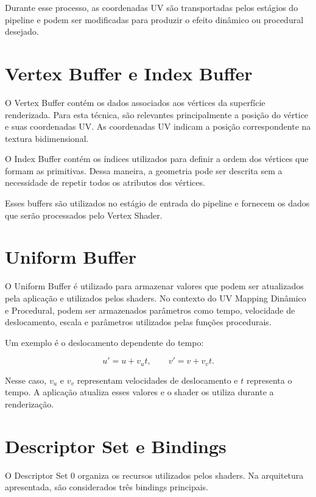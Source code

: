 Durante esse processo, as coordenadas UV são transportadas pelos estágios do
pipeline e podem ser modificadas para produzir o efeito dinâmico ou
procedural desejado.

\section{Vertex Buffer e Index Buffer}

O Vertex Buffer contém os dados associados aos vértices da superfície
renderizada. Para esta técnica, são relevantes principalmente a posição do
vértice e suas coordenadas UV. As coordenadas UV indicam a posição
correspondente na textura bidimensional.

O Index Buffer contém os índices utilizados para definir a ordem dos
vértices que formam as primitivas. Dessa maneira, a geometria pode ser
descrita sem a necessidade de repetir todos os atributos dos vértices.

Esses buffers são utilizados no estágio de entrada do pipeline e fornecem os
dados que serão processados pelo Vertex Shader.

\section{Uniform Buffer}

O Uniform Buffer é utilizado para armazenar valores que podem ser atualizados
pela aplicação e utilizados pelos shaders. No contexto do UV Mapping
Dinâmico e Procedural, podem ser armazenados parâmetros como tempo,
velocidade de deslocamento, escala e parâmetros utilizados pelas funções
procedurais.

Um exemplo é o deslocamento dependente do tempo:

\begin{equation}
u' = u + v_u t,
\qquad
v' = v + v_v t.
\end{equation}

Nesse caso, $v_u$ e $v_v$ representam velocidades de deslocamento e $t$
representa o tempo. A aplicação atualiza esses valores e o shader os utiliza
durante a renderização.

\section{Descriptor Set e Bindings}

O Descriptor Set 0 organiza os recursos utilizados pelos shaders. Na
arquitetura apresentada, são considerados três bindings principais.

